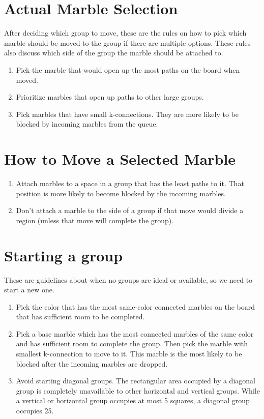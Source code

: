\documentclass[a4paper,12pt]{article}
\begin{document}
\section*{Actual Marble Selection}

After deciding which group to move, these are the rules on how to pick which marble should be moved to the group
if there are multiple options. These rules also discuss which side of the group the marble should be attached to.

\begin{enumerate}[1)]
    
    \item Pick the marble that would open up the most paths on the board when moved. 
    \item Prioritize marbles that open up paths to other large groups.
    \item Pick marbles that have small k-connections. They are more
      likely to be blocked by incoming marbles from the queue.

\end{enumerate}

\section*{How to Move a Selected Marble}

\begin{enumerate}[1)]
    \item Attach marbles to a space in a  group that has the least
      paths to it. That position is more likely to become blocked by the
      incoming marbles.
    \item Don't attach a marble to the side of a group if that move
      would divide a region (unless that move will complete the group).
      
\end{enumerate}

\section*{Starting a group}

These are guidelines about when no groups are ideal or available, so we need to start a new one.

\begin{enumerate}[1)]
    
    \item Pick the color that has the most same-color connected
      marbles on the board that has sufficient room to be completed.
    \item Pick a base marble which has the most connected marbles of
      the same color and  has sufficient room to complete the
      group. Then pick the marble with smallest k-connection to move
      to it. This marble is the most likely to be blocked after the
      incoming marbles are dropped.
    \item Avoid starting diagonal groups. The rectangular area
      occupied by a diagonal group is completely unavailable to other
      horizontal and vertical groups. While a vertical or horizontal
      group occupies at most 5 squares, a diagonal group occupies 25.

\end{enumerate}
\end{document}
